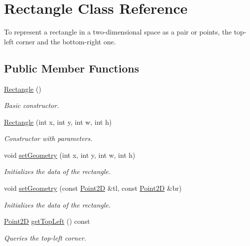 \hypertarget{classRectangle}{}\section{Rectangle Class Reference}
\label{classRectangle}


To represent a rectangle in a two-\/dimensional space as a pair or points, the top-\/left corner and the bottom-\/right one.  


\subsection*{Public Member Functions}
\begin{DoxyCompactItemize}
\item 
\mbox{\label{classRectangle_a8a933e0ebd9e80ce91e61ffe87fd577e}} 
\hyperlink{classRectangle_a8a933e0ebd9e80ce91e61ffe87fd577e}{Rectangle} ()
\begin{DoxyCompactList}\small\item\em Basic constructor. \end{DoxyCompactList}\item 
\hyperlink{classRectangle_a1546993e9fc10b8d128f4a85ed68c653}{Rectangle} (int x, int y, int w, int h)
\begin{DoxyCompactList}\small\item\em Constructor with parameters. \end{DoxyCompactList}\item 
void \hyperlink{classRectangle_a31c4b9fc0d1ddf912f114da494e50205}{set\+Geometry} (int x, int y, int w, int h)
\begin{DoxyCompactList}\small\item\em Initializes the data of the rectangle. \end{DoxyCompactList}\item 
void \hyperlink{classRectangle_af8d143717fa47878690b12705a687b38}{set\+Geometry} (const \hyperlink{classPoint2D}{Point2D} \&tl, const \hyperlink{classPoint2D}{Point2D} \&br)
\begin{DoxyCompactList}\small\item\em Initializes the data of the rectangle. \end{DoxyCompactList}\item 
\hyperlink{classPoint2D}{Point2D} \hyperlink{classRectangle_a812afd6deed0cdec0b4ad7b2bd93871d}{get\+Top\+Left} () const
\begin{DoxyCompactList}\small\item\em Queries the top-\/left corner. \end{DoxyCompactList}\item 

\end{DoxyCompactItemize}
